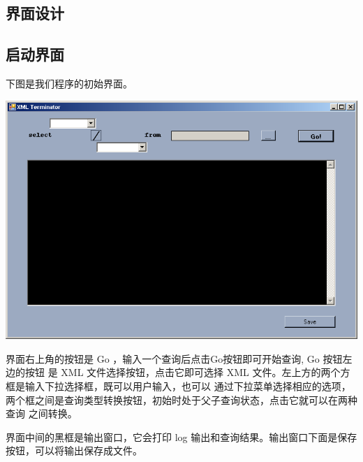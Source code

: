 \documentclass[10pt]{article}
\begin{document}
\begin{CJK}{UTF8}{gbsn}
\section{界面设计}
\subsection{启动界面}
下图是我们程序的初始界面。
\begin{center}
\includegraphics[width=0.9\linewidth]{startup.png}
\end{center}

界面右上角的按钮是 Go ，输入一个查询后点击Go按钮即可开始查询, Go 按钮左边的按钮
是 XML 文件选择按钮，点击它即可选择 XML 文件。左上方的两个方框是输入下拉选择框，既可以用户输入，也可以
通过下拉菜单选择相应的选项，两个框之间是查询类型转换按钮，初始时处于父子查询状态，点击它就可以在两种查询
之间转换。

界面中间的黑框是输出窗口，它会打印 log 输出和查询结果。输出窗口下面是保存按钮，可以将输出保存成文件。


\end{CJK}
\end{document}
